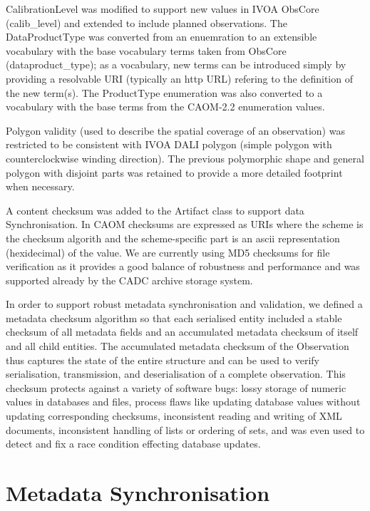 \documentclass[11pt,twoside]{article}
\begin{document}
CalibrationLevel was modified to support new values in IVOA ObsCore \citep{std:ObsCore} (calib\_level) and extended to include planned observations. The DataProductType was converted from an enuemration to an extensible vocabulary with the base vocabulary terms taken from ObsCore (dataproduct\_type); as a vocabulary, new terms can be introduced simply by providing a resolvable URI (typically an http URL) refering to the definition of the new term(s). The ProductType enumeration was also converted to a vocabulary with the base terms from the CAOM-2.2 enumeration values.

Polygon validity (used to describe the spatial coverage of an observation) was restricted to be consistent with IVOA DALI \citep{std:DALI} polygon (simple polygon with counterclockwise winding direction). The previous polymorphic shape and general polygon with disjoint parts was retained to provide a more detailed footprint when necessary.

A content checksum was added to the Artifact class to support data Synchronisation. In CAOM checksums are expressed as URIs where the scheme is the checksum algorith and the scheme-specific part is an ascii representation (hexidecimal) of the value. We are currently using MD5 checksums for file verification as it provides a good balance of robustness and performance and was supported already by the CADC archive storage system.

In order to support robust metadata synchronisation and validation, we defined a metadata checksum algorithm so that each serialised entity included a stable checksum of all metadata fields and an accumulated metadata checksum of itself and all child entities. The accumulated metadata checksum of the Observation thus captures the state of the entire structure and can be used to verify serialisation, transmission, and deserialisation of a complete observation. This checksum protects against a variety of software bugs: lossy storage of numeric values in databases and files, process flaws like updating database values without updating corresponding checksums, inconsistent reading and writing of XML documents, inconsistent handling of lists or ordering of sets, and was even used to detect and fix a race condition effecting database updates.

\section{Metadata Synchronisation}
\end{document}
